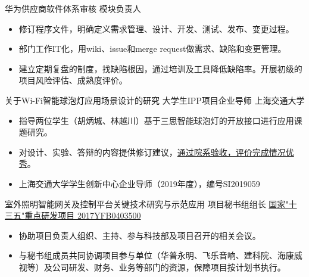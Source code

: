 \documentclass[10pt,a4paper]{moderncv/moderncv}
\begin{document}
{华为供应商软件体系审核}
{模块负责人}
{}{}
{
\begin{itemize}
	\item 修订程序文件，明确定义需求管理、设计、开发、测试、发布、变更过程。
	\item 部门工作IT化，用wiki、issue和merge request做需求、缺陷和变更管理。
	\item 建立定期复盘的制度，找缺陷根因，通过培训及工具降低缺陷率。开展初级的项目风险评估、成熟度评价。
\end{itemize}
}

{关于Wi-Fi智能球泡灯应用场景设计的研究}
{大学生IPP项目企业导师}
{上海交通大学}{}
{
\begin{itemize}
	\item 指导两位学生（胡炳城、林越川）基于三思智能球泡灯的开放接口进行应用课题研究。
	\item 对设计、实验、答辩的内容提供修订建议，\href{https://bingcheng1998.github.io/zh-CN/制作/sansi全彩灯泡的app设计.html}{通过院系验收，评价完成情况优秀}。
	\item 上海交通大学学生创新中心企业导师（2019年度），编号SI2019059
\end{itemize}
}

{室外照明智能网关及控制平台关键技术研究与示范应用}
{项目秘书组组长}
{\href{http://service.most.gov.cn/u/cms/static/201706/05145323ywhn.pdf}{国家"十三五"重点研发项目 2017YFB0403500}}{}
{
\begin{itemize}
	\item 协助项目负责人组织、主持、参与科技部及项目召开的相关会议。
	\item 与秘书组成员共同协调项目参与单位（华普永明、飞乐音响、建科院、海康威视等）及公司研发、财务、业务等部门的资源，保障项目按计划书执行。
\end{itemize}
}


\end{document}
